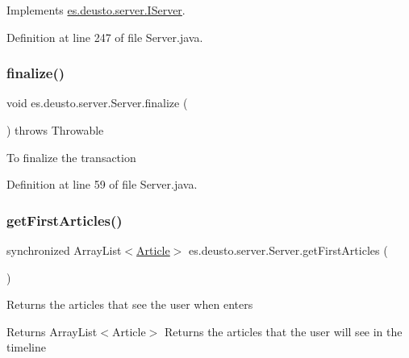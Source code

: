 Implements \hyperlink{interfacees_1_1deusto_1_1server_1_1_i_server_ab5c4258f62146d90a064604891cedf2f}{es.\+deusto.\+server.\+I\+Server}.



Definition at line 247 of file Server.\+java.

\mbox{\label{classes_1_1deusto_1_1server_1_1_server_a168b866b961a3d54b38834db9b52ca80}} 
\subsubsection{\texorpdfstring{finalize()}{finalize()}}
{\footnotesize\ttfamily void es.\+deusto.\+server.\+Server.\+finalize (\begin{DoxyParamCaption}{ }\end{DoxyParamCaption}) throws Throwable\hspace{0.3cm}{\ttfamily [protected]}}

To finalize the transaction 

Definition at line 59 of file Server.\+java.

\mbox{\label{classes_1_1deusto_1_1server_1_1_server_a64dfcee7821b0cc581367c1b21d9f97f}} 
\subsubsection{\texorpdfstring{get\+First\+Articles()}{getFirstArticles()}}
{\footnotesize\ttfamily synchronized Array\+List$<$\hyperlink{classes_1_1deusto_1_1server_1_1jdo_1_1_article}{Article}$>$ es.\+deusto.\+server.\+Server.\+get\+First\+Articles (\begin{DoxyParamCaption}{ }\end{DoxyParamCaption})}

Returns the articles that see the user when enters

\begin{DoxyReturn}{Returns}
Array\+List$<$\+Article$>$ Returns the articles that the user will see in the timeline 
\end{DoxyReturn}


